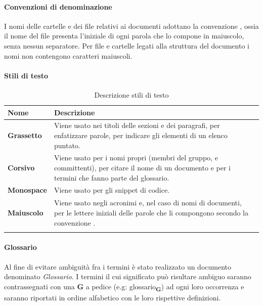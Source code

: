 {\paragraph*{Convenzioni di denominazione}   
I nomi delle cartelle e dei file relativi ai documenti adottano la convenzione , ossia il nome del file presenta l'iniziale di ogni parola che lo compone in maiuscolo, senza nessun separatore. Per file e cartelle legati alla struttura del documento i nomi non contengono caratteri maiuscoli. 
\paragraph*{Stili di testo} 


	\setlength{\freewidth}{\dimexpr\textwidth-1\tabcolsep}
	\renewcommand{\arraystretch}{1.5}
	\setlength{\aboverulesep}{0pt}
	\setlength{\belowrulesep}{0pt}
	\begin{longtable}{L{.210\freewidth} L{.6\freewidth} L{.080\freewidth}}
		\textbf{Nome} & \textbf{Descrizione} \\
		\toprule
		\endhead		
		\textbf{Grassetto} & Viene usato nei titoli delle sezioni e dei paragrafi, per enfatizzare parole, per indicare gli elementi di un elenco puntato. \\
		\textbf{Corsivo} & Viene usato per i nomi propri (membri del gruppo,   e committenti), per citare il nome di un documento e per i termini che fanno parte del glossario.\\
		\textbf{Monospace} & Viene usato per gli snippet di codice. \\
		\textbf{Maiuscolo} & Viene usato negli acronimi e, nel caso di nomi di documenti, per le lettere iniziali delle parole che li compongono secondo la convenzione \textit{}. \\
		\bottomrule
		\hiderowcolors
		\caption{Descrizione stili di testo}
	\end{longtable}
\paragraph*{Glossario}  
Al fine di evitare ambiguità fra i termini è stato realizzato un documento denominato \textit{Glossario}. I termini il cui significato può risultare ambiguo saranno contrassegnati con una \textbf{G} a pedice (e.g: \texorpdfstring{glossario\textsubscript{\textbf{G}}})) ad ogni loro occorrenza e saranno riportati in ordine alfabetico con le loro rispettive definizioni. 
}
